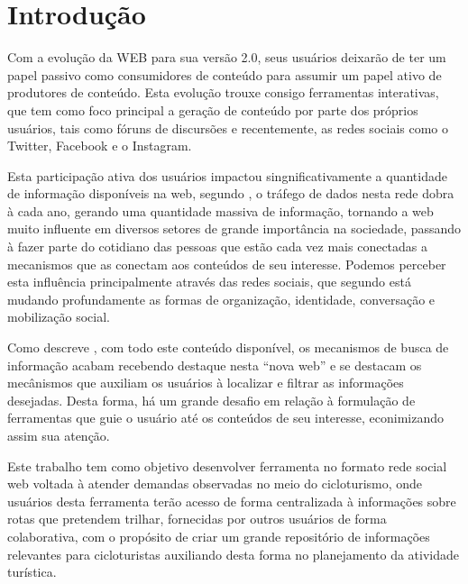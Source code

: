\section{\esp Introdução}
Com a evolução da WEB para sua versão 2.0, seus usuários deixarão de ter um papel passivo como consumidores de conteúdo para assumir
um papel ativo de produtores de conteúdo. Esta evolução trouxe consigo ferramentas interativas, que tem como foco principal a geração de 
conteúdo por parte dos próprios usuários, tais como fóruns de discursões e recentemente, as redes sociais como o Twitter, Facebook 
e o Instagram.

Esta participação ativa dos usuários impactou singnificativamente a quantidade de informação disponíveis na web, segundo \cite{artigo01}, 
o tráfego de dados nesta rede dobra à cada ano, gerando uma quantidade massiva de informação, tornando a web muito influente em diversos setores 
de grande importância na sociedade, passando à fazer parte do cotidiano das pessoas que estão cada vez mais conectadas a mecanismos que as 
conectam aos conteúdos de seu interesse. Podemos perceber esta influência principalmente através das redes sociais, que segundo 
\cite{redesSociais01} está mudando profundamente as formas de organização, identidade, conversação e mobilização social.

Como descreve \cite{deitelAjax}, com todo este conteúdo disponível, os mecanismos de busca de informação 
acabam recebendo destaque nesta ``nova web'' e se destacam os mecânismos que auxiliam os usuários  à localizar e filtrar 
as informações desejadas. Desta forma, há um grande desafio em relação à formulação de ferramentas que guie o usuário até os conteúdos de seu 
interesse, econimizando assim sua atenção.

Este trabalho tem como objetivo desenvolver ferramenta no formato rede social web voltada à atender demandas observadas no meio do cicloturismo,
onde usuários desta ferramenta terão acesso de forma centralizada à informações sobre rotas que pretendem trilhar, fornecidas por outros usuários
de forma colaborativa, com o propósito de criar um grande repositório de informações relevantes para cicloturistas auxiliando desta forma no 
planejamento da atividade turística.